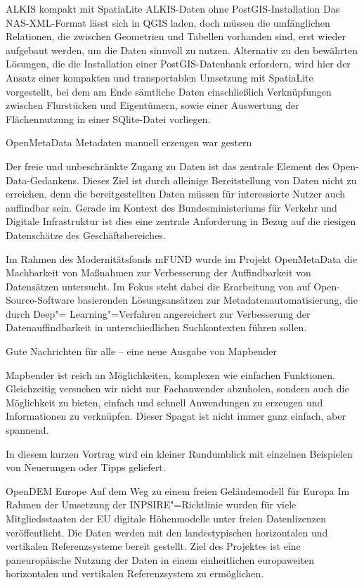 %
{ALKIS kompakt mit SpatiaLite}%
{ALKIS-Daten ohne PostGIS-Installation}%
{
Das NAS-XML-Format lässt sich in QGIS laden, doch müssen die umfänglichen Relationen, die zwischen
Geometrien und Tabellen vorhanden sind, erst wieder aufgebaut werden, um die Daten sinnvoll zu
nutzen.
Alternativ zu den bewährten Lösungen, die die Installation einer PostGIS-Datenbank
erfordern, wird hier der Ansatz einer kompakten und transportablen Umsetzung mit SpatiaLite
vorgestellt, bei dem am Ende sämtliche Daten einschließlich Verknüpfungen zwischen Flurstücken und
Ei\-gen\-tü\-mern, sowie einer Auswertung der Flä\-chen\-nut\-zung in einer SQlite-Datei vorliegen.%
}

%
{OpenMetaData}%
{Metadaten manuell erzeugen war gestern}%
{
Der freie und unbeschränkte Zugang zu Daten ist das zentrale Element des Open-Data-Gedankens. Dieses
Ziel ist durch alleinige Bereitstellung von Daten nicht zu erreichen, denn die bereitgestellten
Daten müssen für interessierte Nutzer auch auffindbar sein. Gerade im Kontext des Bundesministeriums
für Verkehr und Digitale Infrastruktur ist dies eine zentrale Anforderung in Bezug auf die riesigen
Datenschätze des Geschäftsbereiches.

Im Rahmen des Modernitätsfonds mFUND wurde im Projekt OpenMetaData die Machbarkeit von Maßnahmen zur
Verbesserung der Auffindbarkeit von Datensätzen untersucht. Im Fokus steht dabei die Erarbeitung von
auf Open-Source-Software basierenden Lösungsansätzen zur Metadatenautomatisierung, die durch Deep"=
Learning"=Verfahren angereichert zur Verbesserung der Datenauffindbarkeit in
unterschiedlichen Suchkontexten führen sollen.
}

%
{Gute Nachrichten für alle -- eine neue Ausgabe von Mapbender}%
{}%
{
Mapbender ist reich an Möglichkeiten, komplexen wie einfachen
Funktionen. Gleichzeitig versuchen wir nicht nur
Fachanwender abzuholen, sondern auch die Möglichkeit zu bieten, einfach und
schnell Anwendungen zu erzeugen und Informationen zu verknüpfen. Dieser
Spagat ist nicht immer ganz einfach, aber spannend.

In diesem kurzen Vortrag wird ein kleiner Rundumblick mit einzelnen
Beispielen von Neuerungen oder Tipps geliefert.%
}

%
{OpenDEM Europe}%
{Auf dem Weg zu einem freien Geländemodell für Europa}%
{
Im Rahmen der Umsetzung der INPSIRE"=Richtlinie wurden für viele Mitgliedsstaaten der EU
digitale Höhenmodelle unter freien Datenlizenzen veröffentlicht. Die Daten werden mit den
landestypischen horizontalen und vertikalen Referenzsysteme bereit gestellt. Ziel des Projektes ist
eine paneuropäische Nutzung der Daten in einem einheitlichen europaweiten horizontalen und
vertikalen Referenzsystem zu ermöglichen.%
}

